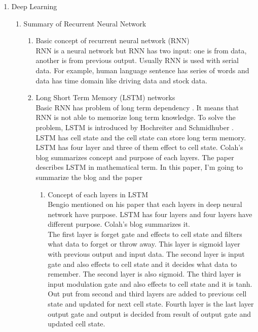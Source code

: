\documentclass[12pt]{article}
\begin{document}
\begin{enumerate}
\item Deep Learning
	\begin{enumerate}
	\item Summary of Recurrent Neural Network
		\begin{enumerate}
		\item Basic concept of recurrent neural network (RNN)\\
			RNN is a neural network but RNN has two input: one is from data, another is from previous output. Usually RNN is used with serial data. For example, human language sentence has series of words and data has time domain like driving data and stock data.
		\item Long Short Term Memory (LSTM) networks\\		
			Basic RNN has problem of long term dependency \cite{UnderstandingLSTMNetworks}. It means that RNN is not able to memorize long term knowledge. To solve the problem, LSTM is introduced by Hochreiter and Schmidhuber \cite{hochreiter1997long}. LSTM has cell state and the cell state can store long term memory. LSTM has four layer and three of them effect to cell state. Colah's blog \cite{UnderstandingLSTMNetworks} summarizes concept and purpose of each layers. The paper \cite{zaremba2014recurrent} describes LSTM in mathematical term. In this paper, I'm going to summarize the blog \cite{UnderstandingLSTMNetworks} and the paper \cite{zaremba2014recurrent}
			\begin{enumerate}
			\item Concept of each layers in LSTM\\
				Bengio mentioned on his paper \cite{bengio2009learning} that each layers in deep neural network have purpose. LSTM has four layers and four layers have different purpose. Colah's blog \cite{UnderstandingLSTMNetworks} summarizes it.\\
				The first layer is forget gate and effects to cell state and filters what data to forget or throw away. This layer is sigmoid layer with previous output and input data. The second layer is input gate and also effects to cell state and it decides what data to remember. The second layer is also sigmoid. The third layer is input modulation gate and also effects to cell state and it is tanh. Out put from second and third layers are added to previous cell state and updated for next cell state. Fourth layer is the last layer output gate and output is decided from result of output gate and updated cell state.
				

\end{enumerate}
\end{enumerate}
\end{enumerate}
\end{enumerate}
\end{document}
